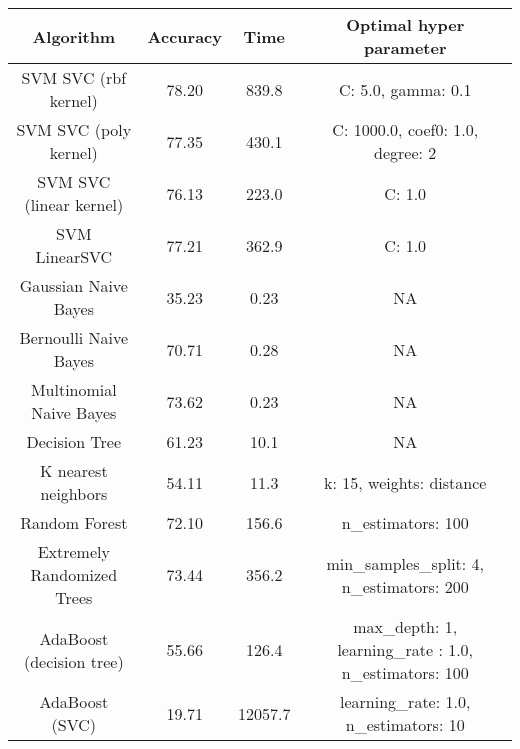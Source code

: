 \begin{table}
\begin{center}
	\begin{tabular}{c|c|c|c}
    \hline
	     Algorithm   & Accuracy & Time & Optimal hyper parameter\\
         \hline
         SVM SVC (rbf kernel)   & 78.20  & 839.8 & C: 5.0, gamma: 0.1\\
         \hline
         SVM SVC (poly kernel)  & 77.35  & 430.1 & C: 1000.0, coef0: 1.0, degree: 2\\
         \hline
         SVM SVC (linear kernel)   &  76.13  & 223.0 & C: 1.0\\
         \hline
         SVM LinearSVC    &  77.21   &362.9  & C: 1.0\\
         \hline
         \hline
         Gaussian Naive Bayes & 35.23 & 0.23 & NA \\
         \hline
         Bernoulli Naive Bayes &   70.71    & 0.28  & NA \\
         \hline
         Multinomial Naive Bayes & 73.62 	& 0.23  & NA \\
         \hline
         \hline
         Decision Tree &  61.23 & 10.1 & NA \\
         \hline
         \hline
         K nearest neighbors & 54.11 & 11.3 & k: 15, weights:  distance\\
         \hline
         \hline
         Random Forest & 72.10 & 156.6 & n\_estimators: 100\\
         \hline
         Extremely Randomized Trees & 73.44 & 356.2 &
         min\_samples\_split: 4,
         n\_estimators: 200 \\
         \hline
         AdaBoost (decision tree) & 55.66 & 126.4 & max\_depth: 1, learning\_rate : 1.0, n\_estimators: 100\\
         \hline
         AdaBoost (SVC) & 19.71 & 12057.7 & learning\_rate: 1.0,
         n\_estimators: 10\\
         \hline
          \end{tabular}
\end{center}
\end{table}